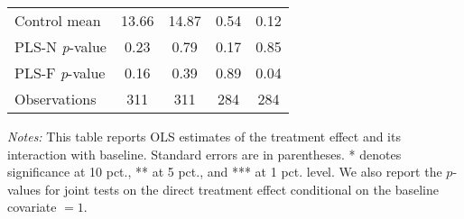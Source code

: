 \begin{table}[ht]
{\begin{threeparttable}
\begin{tabular}{l*{4}{c}}
Control mean    &    13.66         &    14.87         &     0.54         &     0.12         \\
PLS-N \emph{p}-value&     0.23         &     0.79         &     0.17         &     0.85         \\
PLS-F \emph{p}-value&     0.16         &     0.39         &     0.89         &     0.04         \\
Observations    &      311         &      311         &      284         &      284         \\
\bottomrule \end{tabular} \begin{tablenotes}[flushleft] \footnotesize \item \emph{Notes:} This table reports OLS estimates of the treatment effect and its interaction with baseline. Standard errors are in parentheses. * denotes significance at 10 pct., ** at 5 pct., and *** at 1 pct. level. We also report the \(p\)-values for joint tests on the direct treatment effect conditional on the baseline covariate $= 1$. \end{tablenotes} \end{threeparttable} } \end{table}

